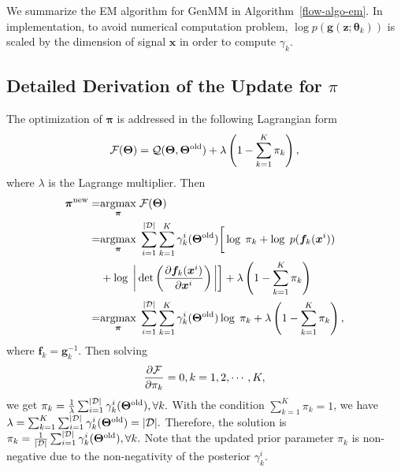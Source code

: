 We summarize the EM algorithm for GenMM in Algorithm~\ref{flow-algo-em}.
In implementation, to avoid numerical computation problem, $\log{p(\bm{g}(\bm{z}; \bm{\theta}_k))}$ is
scaled by the dimension of signal $\bm{x}$ in order to compute $\gamma_k$. 
\vfill

\subsection{Detailed Derivation of the Update for $\pi$}
\label{subsubsec:Proof_for_update}

The optimization of $\bm{\pi}$ is addressed in the following Lagrangian form
\begin{equation}
  \mathcal{F}(\bm{\Theta}) = \mathcal{Q}(\bm{\Theta},\bm{\Theta}^{\mathrm{old}}) + \lambda
  \left( 1 - \sum_{k=1}^{K}\pi_k \right),
\end{equation}
where $\lambda$ is the Lagrange multiplier. Then
\begin{align}
  \bm{\pi}^{\mathrm{new}} =& \underset{\bm{\pi}}{\operatorname{argmax}}\;{ \mathcal{F}(\bm{\Theta})} \nonumber\\
  =&  \underset{\bm{\pi}}{\operatorname{argmax}}\;{}\sum_{i=1}^{| \mathcal{D} |}
     \sum_{k=1}^{K}\gamma_k^{i}(\bm{\Theta}^{\mathrm{old}})\bigg[
     \log\;\pi_k +   \log\;p(\bm{f}_k(\bm{x}^{i})) \nonumber \\
                           &+ \log\;\bigg|\det\left(
                             \frac{ \partial \bm{f}_k(\bm{x}^{i})}{\partial \bm{x}^{i}}
                             \right)\bigg|\bigg] + \lambda  \left( 1 - \sum_{k=1}^{K}\pi_k \right) \nonumber\\
  =& \underset{\bm{\pi}}{\operatorname{argmax}}\;{} \sum_{i=1}^{| \mathcal{D} |}
     \sum_{k=1}^{K}\gamma_k^{i}(\bm{\Theta}^{\mathrm{old}})
     \log\;\pi_k+ \lambda  \left( 1 - \sum_{k=1}^{K}\pi_k \right),
\end{align}
where $\bm{f}_k = \bm{g}_k^{-1}$. Then solving
\begin{equation}
  \frac{ \partial \mathcal{F}}{\partial \pi_k} = 0, k=1, 2, \cdots, K,
\end{equation}
we get 
$
\pi_k = \frac{1}{\lambda}
\sum_{i=1}^{| \mathcal{D} |}\gamma_k^{i}(\bm{\Theta}^{\mathrm{old}}), \forall k.
$
With the condition $\sum_{k=1}^{K}\pi_k =1$, we have
$
\lambda = \sum_{k=1}^{K}\sum_{i=1}^{| \mathcal{D} |}\gamma_k^{i}(\bm{\Theta}^{\mathrm{old}}) =| \mathcal{D} |.
$
Therefore, the solution is
$
\pi_k = \frac{1}{| \mathcal{D} |}
\sum_{i=1}^{| \mathcal{D} |}\gamma_k^{i}(\bm{\Theta}^{\mathrm{old}}), \forall k.
$
Note that the updated prior parameter $\pi_k$
is non-negative due to the non-negativity of the posterior $\gamma_k^{i}$.

